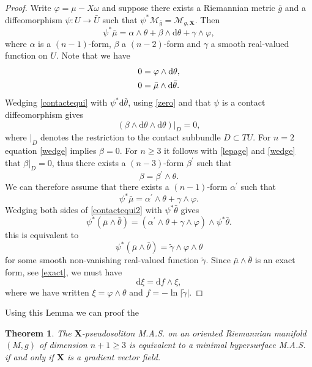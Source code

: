 \documentclass[11pt,letterpaper]{amsart}
\newtheorem{theorem}{Theorem}[section]
\theoremstyle{definition}
\numberwithin{equation}{section}
\begin{document}
\begin{proof}
Write $\varphi=\mu-X\omega$ and suppose there exists a Riemannian metric $\bar{g}$ and a diffeomorphism $\psi : U \to \bar{U}$ such that $\psi^*\mathcal{M}_{\bar{g}}=\mathcal{M}_{g,{\mathbf{X}}}$. Then 
\begin{equation}\label{contactequi} 
\psi^*\bar{\mu}=\alpha\wedge\theta+\beta\wedge {\mathrm{d}}\theta+\gamma\wedge\varphi,
\end{equation}
where $\alpha$ is a $(n-1)$-form, $\beta$ a $(n-2)$-form and $\gamma$ a smooth real-valued function on $U$. Note that we have
\begin{equation}\label{zero}
\aligned
0&=\varphi \wedge {\mathrm{d}}\theta,\\
0&=\bar{\mu}\wedge {\mathrm{d}}\bar{\theta}.
\endaligned
\end{equation}
Wedging \eqref{contactequi} with $\psi^*{\mathrm{d}}\bar{\theta}$, using \eqref{zero} and that $\psi$ is a contact diffeomorphism gives
\begin{equation}\label{wedge}
\left(\beta\wedge{\mathrm{d}}\theta\wedge {\mathrm{d}}\theta\right)\vert_{D}=0,
\end{equation}
where $\vert_{D}$ denotes the restriction to the contact subbundle ${D} \subset TU$. For $n=2$ equation \eqref{wedge} implies $\beta=0$. For $n \geq 3$ it follows with \eqref{lepage} and \eqref{wedge} that $\beta\vert_{D}=0$, thus there exists a $(n-3)$-form $\beta^{\prime}$ such that
$$
\beta=\beta^{\prime}\wedge\theta.
$$
We can therefore assume that there exists a $(n-1)$-form $\alpha^{\prime}$ such that 
\begin{equation}\label{contactequi2} 
\psi^*\bar{\mu}=\alpha^{\prime}\wedge\theta+\gamma\wedge\varphi.
\end{equation}
Wedging both sides of \eqref{contactequi2} with $\psi^*\bar{\theta}$ gives
$$
\psi^*\left(\bar{\mu}\wedge\bar{\theta}\right)=\left(\alpha^{\prime}\wedge\theta+\gamma\wedge\varphi\right)\wedge\psi^*\bar{\theta}.
$$
this is equivalent to 
$$
\psi^*\left(\bar{\mu}\wedge\bar{\theta}\right)=\tilde{\gamma}\wedge\varphi\wedge\theta
$$
for some smooth non-vanishing real-valued function $\tilde{\gamma}$. Since $\bar{\mu}\wedge\bar{\theta}$ is an exact form, see \eqref{exact}, we must have 
$$
{\mathrm{d}}\xi={\mathrm{d}} f\wedge\xi,
$$
where we have written $\xi=\varphi\wedge\theta$ and $f=-\ln \vert \tilde{\gamma}\vert$. 
\end{proof}

Using this Lemma we can proof the 
\begin{theorem}\label{main}
The ${\mathbf{X}}$-pseudosoliton M.A.S. on an oriented Riemannian manifold $(M,g)$ of dimension $n+1\geq 3$ is equivalent to a minimal hypersurface M.A.S. if and only if ${\mathbf{X}}$ is a gradient vector field. 
\end{theorem}
\end{document}

